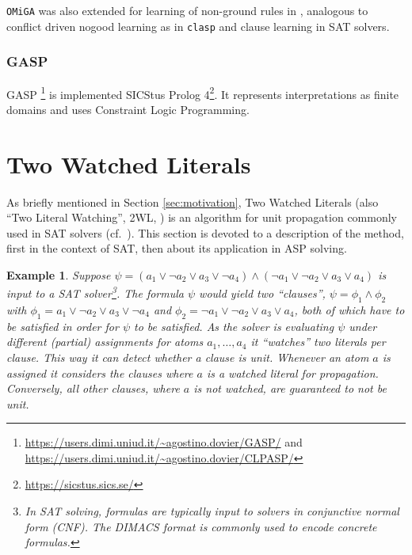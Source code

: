 \documentclass{vutinfth} %
\newtheorem{example}{Example}[chapter]
\newcommand{\clasp}{\texttt{clasp}\xspace}
\newcommand{\omiga}{\texttt{OMiGA}\xspace}
\begin{document}
\omiga was also extended for learning of non-ground rules in \cite{nglearn}, analogous to conflict driven nogood learning as in \clasp and clause learning in SAT solvers.

\subsubsection{GASP}

GASP \cite{gasp,gasp2}\footnote{\url{https://users.dimi.uniud.it/~agostino.dovier/GASP/} and\\ \url{https://users.dimi.uniud.it/~agostino.dovier/CLPASP/}} is implemented SICStus Prolog 4\footnote{\url{https://sicstus.sics.se/}}. It represents interpretations as finite domains and uses Constraint Logic Programming.



\section{Two Watched Literals}
\label{sec:2wl}

As briefly mentioned in Section \ref{sec:motivation}, Two Watched Literals (also \enquote{Two Literal Watching}, 2WL, \cite{effsat,questsat}) is an algorithm for unit propagation commonly used in SAT solvers (cf.~\cite[Section 2.2.2, p.~94]{handbook-sat}). This section is devoted to a description of the method, first in the context of SAT, then about its application in ASP solving.

\begin{example}
\label{ex:clause-prop}
Suppose $\psi = (a_1 \vee \neg a_2 \vee a_3 \vee \neg a_4) \wedge (\neg a_1 \vee \neg a_2 \vee a_3 \vee a_4)$ is input to a SAT solver\footnote{In SAT solving, formulas are typically input to solvers in conjunctive normal form (CNF). The DIMACS format is commonly used to encode concrete formulas.}. The formula $\psi$ would yield two \enquote{clauses}, $\psi = \phi_1 \wedge \phi_2$ with $\phi_1 = a_1 \vee \neg a_2 \vee a_3 \vee \neg a_4$ and $\phi_2 = \neg a_1 \vee \neg a_2 \vee a_3 \vee a_4$, both of which have to be satisfied in order for $\psi$ to be satisfied. As the solver is evaluating $\psi$ under different (partial) assignments for atoms $a_1, \ldots, a_4$ it \enquote{watches} two literals per clause. This way it can detect whether a clause is unit. Whenever an atom $a$ is assigned it considers the clauses where $a$ is a watched literal for propagation. Conversely, all other clauses, where $a$ is not watched, are guaranteed to not be unit.
\end{example}
\end{document}
